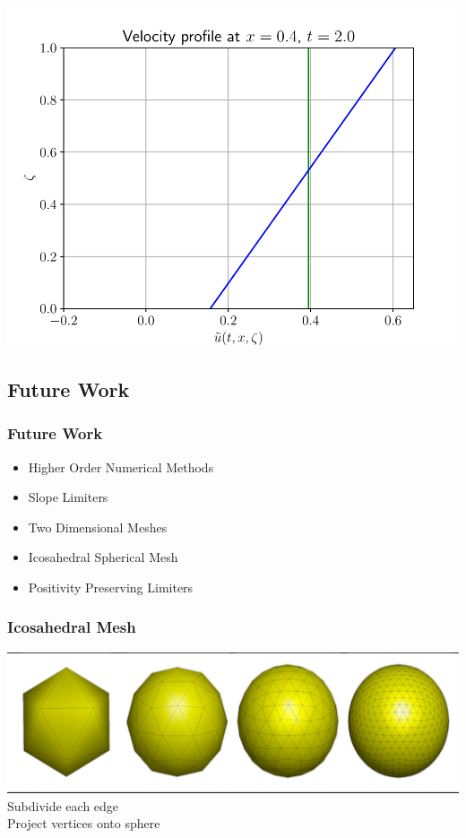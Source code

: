 \documentclass[10pt]{beamer}
\begin{document}
\begin{frame}
        \includegraphics[scale=0.3]{Figures/velocity_profile_0_4.pdf}
      \end{frame}

    \subsection{Future Work}
      \begin{frame}
        \frametitle{Future Work}
        \begin{itemize}
          \item Higher Order Numerical Methods
          \item Slope Limiters
          \item Two Dimensional Meshes
          \item Icosahedral Spherical Mesh
          \item Positivity Preserving Limiters
        \end{itemize}
      \end{frame}

      \begin{frame}
        \frametitle{Icosahedral Mesh}
        \includegraphics[scale=0.3]{Figures/icosahedral_mesh.pdf}
        Subdivide each edge \\
        Project vertices onto sphere
      \end{frame}
\end{document}
